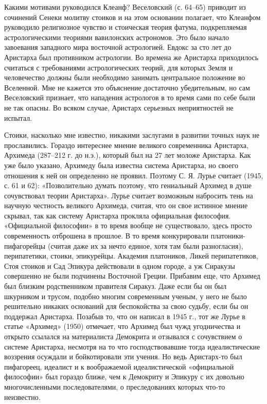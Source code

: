 Какими мотивами  руководился Клеанф? Веселовский (с.  64--65) приводит
из сочинений Сенеки молитву стоиков  и на этом основании полагает, что
Клеанфом руководило  религиозное чувство  и стоическая  теория фатума,
подкрепляемая  астрологическими теориями  вавилонских астрономов.  Это
было начало завоевания западного мира восточной астрологией. Евдокс за
сто  лет  до  Аристарха  был противником  астрологии.  Во  времена  же
Аристарха приходилось считаться с требованиями астрологических теорий,
для  которых  Земля и  человечество  должны  были необходимо  занимать
центральное  положение во  Вселенной.  Мне не  кажется это  объяснение
достаточно убедительным,  но сам  Веселовский признает,  что нападения
астрологов  в то  время сами  по себе  были не  так опасны.  Во всяком
случае, Аристарх серьезных неприятностей не испытал.

Стоики, насколько  мне известно, никакими заслугами  в развитии точных
наук не прославились. Гораздо  интереснее мнение великого современника
Аристарха,  Архимеда (287--212  г. до  н.э.),  который был  на 27  лет
моложе Аристарха. Как уже было указано, Архимеду была известна система
Аристарха,  но  своего отношения  к  ней  он определенно  не  проявил.
Поэтому С. Я. Лурье считает (1945,  с. 61 и 62): «Позволительно думать
поэтому, что гениальный Архимед в душе сочувствовал теории Аристарха».
Лурье считает  возможным набросить тень на  научную честность великого
Архимеда, считая, что он свое истинное мнение скрывал, так как систему
Аристарха прокляла официальная философия. «Официальной философии» в то
время  вообще не  существовало, здесь  просто современность  отброшена
в  прошлое. В  то  время  конкурировали платоники-пифагорейцы  (считая
даже их  за нечто  единое, хотя  там были  разногласия), перипатетики,
стоики,  эпикурейцы. Академия  платоников,  Ликей перипатетиков,  Стоя
стоиков  и Сад  Эпикура  действовали  в одном  городе,  а уж  Сиракузы
совершенно  не  были подчинены  Восточной  Греции.  Прибавим еще,  что
Архимед был близким  родственником правителя Сиракуз. Даже  если бы он
был шкурником и  трусом, подобно многим современным ученым,  у него не
было  решительно никаких  оснований для  беспокойства за  свою судьбу,
если  бы  он  поддержал  Аристарха.  Позабыв  то,  что  он  написал  в
1945  г.,  тот  же  Лурье  в статье  «Архимед»  (1950)  отмечает,  что
Архимед  был  чужд угодничества  и  открыто  ссылался на  материалиста
Демокрита и отзывался  с сочувствием о системе  Аристарха, несмотря на
то  что господствовавшие  тогда идеалистические  воззрения осуждали  и
бойкотировали эти учения. Но ведь Аристарх-то был пифагореец, идеалист
и к  воображаемой идеалистической «официальной философии»  был гораздо
ближе,  чем  к  Демокриту  и Эпикуру  с  их  довольно  многочисленными
последователями, о преследованиях которых что-то неизвестно.

